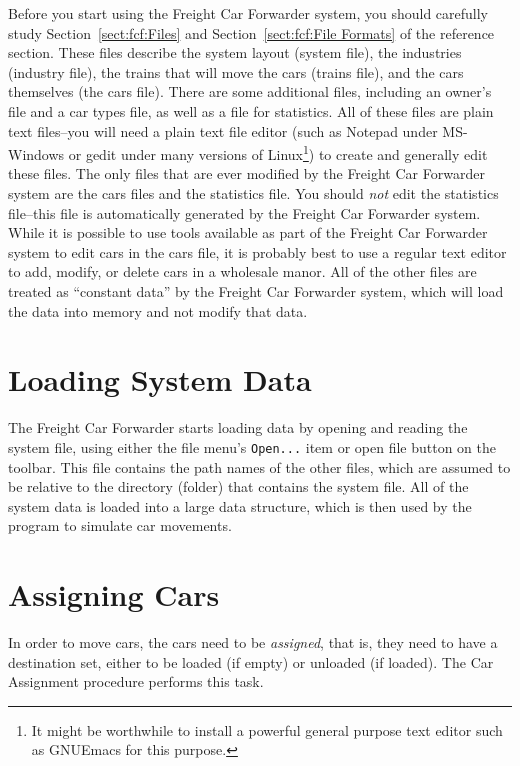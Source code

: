 Before you start using the Freight Car Forwarder system, you should
carefully study Section~\ref{sect:fcf:Files} and 
Section~\ref{sect:fcf:File Formats} of the reference section.   These
files describe the system layout (system file), the industries
(industry file), the trains that will move the cars (trains file), and
the cars themselves (the cars file).  There are some additional files,
including an owner's file and a car types file, as well as a file for
statistics.  All of these files are plain text files--you will need a
plain text file editor (such as Notepad under MS-Windows or gedit under
many versions of Linux\footnote{It might be worthwhile to install a
powerful general purpose text editor such as GNUEmacs for this
purpose.}) to create and generally edit these files. The only files
that are ever modified by the Freight Car Forwarder system are the cars
files and the statistics file. You should \emph{not} edit the statistics
file--this file is automatically generated by the Freight Car Forwarder
system.  While it is possible to use tools available as part of the
Freight Car Forwarder system to edit cars in the cars file, it is
probably best to use a regular text editor to add, modify, or delete
cars in a wholesale manor.  All of the other files are treated as
``constant data'' by the Freight Car Forwarder system, which will load
the data into memory and not modify that data.

\section{Loading System Data}

The Freight Car Forwarder starts loading data by opening and reading
the system file, using either the file menu's \verb=Open...= item or open file
button on the toolbar.  This file contains the path names of the other
files, which are assumed to be relative to the directory (folder) that
contains the system file.  All of the system data is loaded into a
large data structure, which is then used by the program to simulate car
movements.

\section{Assigning Cars}

  In order to move cars, the cars need to be \emph{assigned}, that is, they
need to have a destination set, either to be loaded (if empty) or
unloaded (if loaded).  The Car Assignment procedure performs this task.

